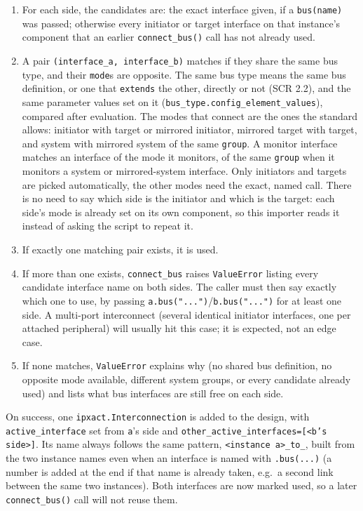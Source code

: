 \documentclass[11pt]{article}
\newcommand{\code}[1]{\texttt{#1}}
\begin{document}
\begin{enumerate}
    \item For each side, the candidates are: the exact interface given, if a
    \code{bus(name)} was passed; otherwise every initiator or target interface on that
    instance's component that an earlier \code{connect\_bus()} call has not already used.
    \item A pair \code{(interface\_a, interface\_b)} matches if they share the same bus
    type, and their \code{mode}s are opposite. The same bus type means the same bus
    definition, or one that \code{extends} the other, directly or not (SCR 2.2), and the
    same parameter values set on it (\code{bus\_type.config\_element\_values}), compared
    after evaluation. The modes that connect are the ones the standard allows: initiator with
    target or mirrored initiator, mirrored target with target, and system with mirrored
    system of the same \code{group}. A monitor interface matches an interface of the mode
    it monitors, of the same \code{group} when it monitors a system or mirrored-system
    interface. Only initiators and targets are picked automatically, the other modes
    need the exact, named call. There is no need to say which side is the initiator and
    which is the target: each side's mode is already set on its own component, so this
    importer reads it instead of asking the script to repeat it.
    \item If exactly one matching pair exists, it is used.
    \item If more than one exists, \code{connect\_bus} raises \code{ValueError} listing
    every candidate interface name on both sides. The caller must then say exactly which
    one to use, by passing \code{a.bus("...")}/\code{b.bus("...")} for at least one side.
    A multi-port interconnect (several identical initiator interfaces, one per attached
    peripheral) will usually hit this case; it is expected, not an edge case.
    \item If none matches, \code{ValueError} explains why (no shared bus definition, no
    opposite mode available, different system groups, or every candidate already used)
    and lists what bus interfaces are still free on each side.
\end{enumerate}

On success, one \code{ipxact.Interconnection} is added to the design, with
\code{active\_interface} set from \code{a}'s side and \code{other\_active\_interfaces=[<b's
side>]}. Its name always follows the same pattern, \code{<instance a>\_to\_<instance b>},
built from the two instance names even when an interface is named with \code{.bus(...)} (a
number is added at the end if that name is already taken, e.g.\ a second link between the
same two instances). Both interfaces are now marked used, so a later
\code{connect\_bus()} call will not reuse them.
\end{document}
